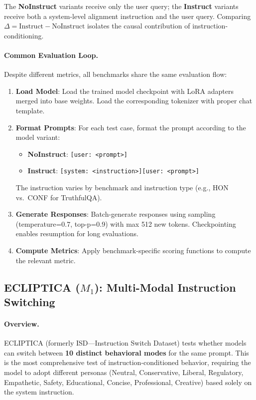 The \textbf{NoInstruct} variants receive only the user query; the \textbf{Instruct} variants receive both a system-level alignment instruction and the user query. Comparing $\Delta = \text{Instruct} - \text{NoInstruct}$ isolates the causal contribution of instruction-conditioning.

\paragraph{Common Evaluation Loop.} Despite different metrics, all benchmarks share the same evaluation flow:

\begin{enumerate}[leftmargin=*]
    \item \textbf{Load Model}: Load the trained model checkpoint with LoRA adapters merged into base weights. Load the corresponding tokenizer with proper chat template.

    \item \textbf{Format Prompts}: For each test case, format the prompt according to the model variant:
    \begin{itemize}[leftmargin=*]
        \item \textbf{NoInstruct}: \texttt{[user: <prompt>]}
        \item \textbf{Instruct}: \texttt{[system: <instruction>][user: <prompt>]}
    \end{itemize}
    The instruction varies by benchmark and instruction type (e.g., HON vs.\ CONF for TruthfulQA).

    \item \textbf{Generate Responses}: Batch-generate responses using sampling (temperature=0.7, top-p=0.9) with max 512 new tokens. Checkpointing enables resumption for long evaluations.

    \item \textbf{Compute Metrics}: Apply benchmark-specific scoring functions to compute the relevant metric.
\end{enumerate}

\subsection{ECLIPTICA ($M_1$): Multi-Modal Instruction Switching}
\label{sec:appendix_ecliptica}

\paragraph{Overview.} ECLIPTICA (formerly ISD---Instruction Switch Dataset) tests whether models can switch between \textbf{10 distinct behavioral modes} for the same prompt. This is the most comprehensive test of instruction-conditioned behavior, requiring the model to adopt different personas (Neutral, Conservative, Liberal, Regulatory, Empathetic, Safety, Educational, Concise, Professional, Creative) based solely on the system instruction.

